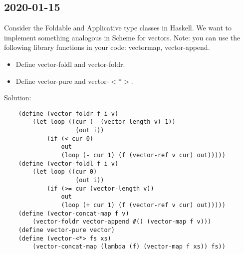 \subsection{2020-01-15}
Consider the Foldable and Applicative type classes in Haskell. We want to implement something
analogous in Scheme for vectors. Note: you can use the following library functions in your code: vectormap, vector-append.
\begin{itemize}
    \item Define vector-foldl and vector-foldr.
    \item Define vector-pure and vector-$<*>$.
\end{itemize}
Solution:
\begin{lstlisting}
    (define (vector-foldr f i v)
        (let loop ((cur (- (vector-length v) 1))
                    (out i))
            (if (< cur 0)
                out
                (loop (- cur 1) (f (vector-ref v cur) out)))))
    (define (vector-foldl f i v)
        (let loop ((cur 0)
                    (out i))
            (if (>= cur (vector-length v))
                out
                (loop (+ cur 1) (f (vector-ref v cur) out)))))
    (define (vector-concat-map f v)
        (vector-foldr vector-append #() (vector-map f v)))
    (define vector-pure vector)
    (define (vector-<*> fs xs)
        (vector-concat-map (lambda (f) (vector-map f xs)) fs))
\end{lstlisting}








